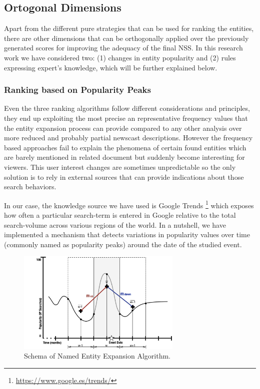 \documentclass{llncs}
\begin{document}

\subsection{Ortogonal Dimensions}

Apart from the different pure strategies that can be used for ranking the entities, there are other dimensions that can be orthogonally applied over the previously generated scores for improving the adequacy of the final NSS. In this research work we have considered two: (1) changes in entity popularity and (2) rules expressing expert's knowledge, which will be further explained below.

\subsubsection{Ranking based on Popularity Peaks}

Even the three ranking algorithms follow different considerations and principles, they end up exploiting the most precise an representative frequency values that the entity expansion process can provide compared to any other analysis over more reduced and probably partial newscast descriptions. However the frequency based approaches fail to explain the phenomena of certain found entities which are barely mentioned in related document but suddenly become interesting for viewers. This user interest changes are sometimes unpredictable so the only solution is to rely in external sources that can provide indications about those search behaviors.

In our case, the knowledge source we have used is Google Trends \footnote{\fontsize{8pt}{1em}\selectfont \url{https://www.google.es/trends/}} which exposes how often a particular search-term is entered in Google relative to the total search-volume across various regions of the world. In a nutshell, we have implemented a mechanism that detects variations in popularity values over time (commonly named as popularity peaks) around the date of the studied event.

\begin{figure}[h!]
\centering
\includegraphics[width=0.7\textwidth]{figure/PopularityMeasure}
\caption{Schema of Named Entity Expansion Algorithm.}
\label{fig:PopularityMeasure}%
\end{figure}
\end{document}
